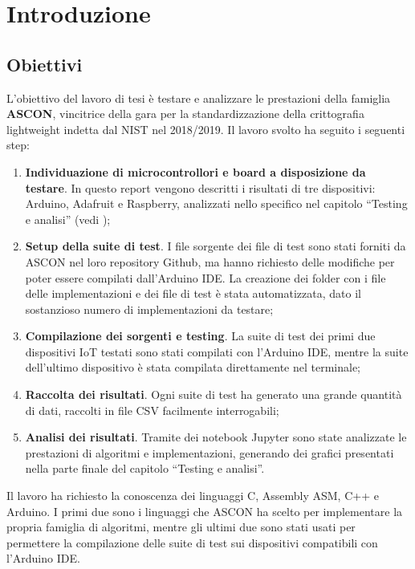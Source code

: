 \chapter{Introduzione}

\section{Obiettivi}

L'obiettivo del lavoro di tesi è testare e analizzare le prestazioni della famiglia \textbf{ASCON}, vincitrice della gara per la standardizzazione della crittografia lightweight indetta dal NIST nel 2018/2019\cite{nist-competition}. Il lavoro svolto ha seguito i seguenti step:
\begin{enumerate}
    \item \textbf{Individuazione di microcontrollori e board a disposizione da testare}. In questo report vengono descritti i risultati di tre dispositivi: Arduino, Adafruit e Raspberry, analizzati nello specifico nel capitolo ``Testing e analisi'' (vedi );
    \item \textbf{Setup della suite di test}. I file sorgente dei file di test sono stati forniti da ASCON nel loro repository Github\cite{github}, ma hanno richiesto delle modifiche per poter essere compilati dall'Arduino IDE. La creazione dei folder con i file delle implementazioni e dei file di test è stata automatizzata, dato il sostanzioso numero di implementazioni da testare;
    \item \textbf{Compilazione dei sorgenti e testing}. La suite di test dei primi due dispositivi IoT testati sono stati compilati con l'Arduino IDE, mentre la suite dell'ultimo dispositivo è stata compilata direttamente nel terminale;
    \item \textbf{Raccolta dei risultati}. Ogni suite di test ha generato una grande quantità di dati, raccolti in file CSV facilmente interrogabili;
    \item \textbf{Analisi dei risultati}. Tramite dei notebook Jupyter sono state analizzate le prestazioni di algoritmi e implementazioni, generando dei grafici presentati nella parte finale del capitolo ``Testing e analisi''.
\end{enumerate}
Il lavoro ha richiesto la conoscenza dei linguaggi C, Assembly ASM, C++ e Arduino. I primi due sono i linguaggi che ASCON ha scelto per implementare la propria famiglia di algoritmi, mentre gli ultimi due sono stati usati per permettere la compilazione delle suite di test sui dispositivi compatibili con l'Arduino IDE. \\


